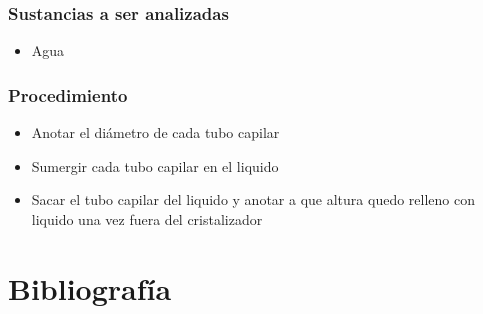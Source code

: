 \documentclass[11pt, letterpaper]{article}
\begin{document}
\subsubsection{Sustancias a ser analizadas}
\begin{itemize}
	\item Agua
\end{itemize}
\subsubsection{Procedimiento}
\begin{itemize}
	\item Anotar el diámetro de cada tubo capilar
	\item Sumergir cada tubo capilar en el liquido 
	\item Sacar el tubo capilar del liquido y anotar a que altura quedo relleno con liquido una vez fuera del cristalizador
\end{itemize}
\section{Bibliografía}
\end{document}
